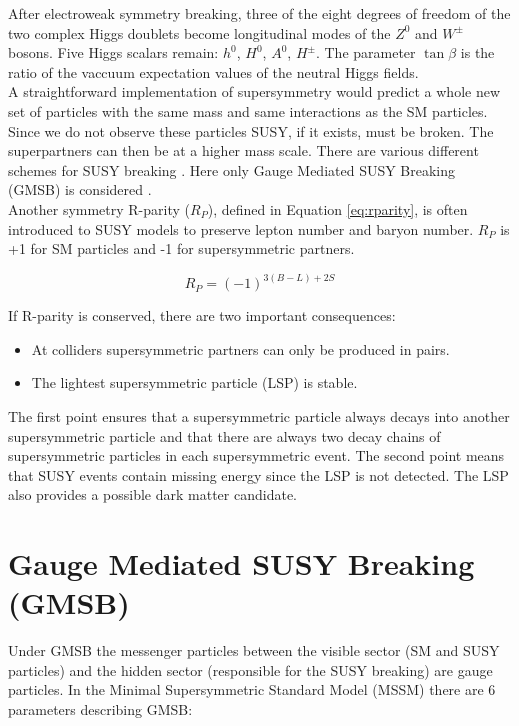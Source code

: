 After electroweak symmetry breaking, three of the eight degrees of freedom of
the two complex Higgs doublets become longitudinal modes of the $Z^{0}$ and
$W^{\pm}$ bosons. Five Higgs scalars remain: $h^{0}$, $H^{0}$, $A^{0}$,
$H^{\pm}$. The parameter $\tan\beta$ is the ratio of the vaccuum expectation
values of the neutral Higgs fields. \\

A straightforward implementation of supersymmetry would predict a whole new set
of particles with the same mass and same interactions as the SM
particles. Since we do not observe these particles SUSY, if it exists, must be 
broken. The superpartners can then be at a higher mass scale. There are various
different schemes for SUSY breaking \cite{aitchison}. Here only Gauge Mediated 
SUSY Breaking (GMSB) is considered \cite{gmsb_at_lhc}. \\

Another symmetry R-parity ($R_{P}$), defined in Equation \ref{eq:rparity}, is 
often introduced to SUSY models to preserve lepton number and baryon number. 
$R_{P}$ is +1 for SM particles and -1 for supersymmetric partners.

\begin{equation}
R_{P} = (-1)^{3(B-L)+2S}
\label{eq:rparity}
\end{equation}

If R-parity is conserved, there are two important consequences:

\begin{itemize}
\item At colliders supersymmetric partners can only be produced in pairs.
\item The lightest supersymmetric particle (LSP) is stable.
\end{itemize}

The first point ensures that a supersymmetric particle always decays into 
another supersymmetric particle and that there are always two decay chains of 
supersymmetric particles in each supersymmetric event. The second point means 
that SUSY events contain missing energy since the LSP is not detected. The LSP 
also provides a possible dark matter candidate.

\section{Gauge Mediated SUSY Breaking (GMSB)}

Under GMSB the messenger particles between the visible sector (SM
and SUSY particles) and the hidden sector (responsible for the SUSY breaking)
are gauge particles. In the Minimal Supersymmetric Standard Model (MSSM) there 
are 6 parameters describing GMSB:

